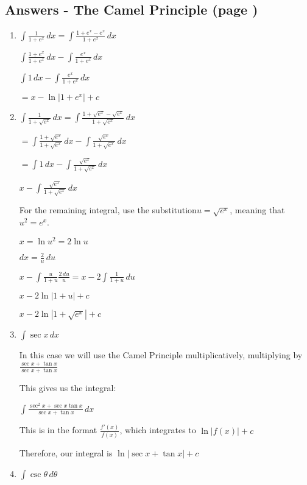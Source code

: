 \documentclass[../main.tex]{subfiles}
\begin{document}
\subsection*{Answers - The Camel Principle (page \pageref{Camel Principle})}

\begin{enumerate}
    \item 
    \(\int \frac{1}{1+e^x}\,dx=\int \frac{1+e^x-e^x}{1+e^x}\,dx\)
    
    \(\int \frac{1+e^x}{1+e^x}\,dx-\int \frac{e^x}{1+e^x}\,dx\)

    \(\int 1\,dx-\int \frac{e^x}{1+e^x}\,dx\)

    \(=x-\ln{|1+e^x|}+c\)
    
    \item 
    \(\int \frac{1}{1+\sqrt{e^x}}\,dx=\int \frac{1+\sqrt{e^x}-\sqrt{e^x}}{1+\sqrt{e^x}}\,dx\)

    \(=\int \frac{1+\sqrt{e^x}}{1+\sqrt{e^x}}\,dx-\int \frac{\sqrt{e^x}}{1+\sqrt{e^x}}\,dx\)

    \(=\int 1\,dx-\int \frac{\sqrt{e^x}}{1+\sqrt{e^x}}\,dx\)

    \(x-\int \frac{\sqrt{e^x}}{1+\sqrt{e^x}}\,dx\)

    For the remaining integral, use the substitution\(u=\sqrt{e^x}\), meaning that \(u^2=e^x\).

    \(x=\ln{u^2}=2\ln{u}\)

    \(dx=\frac{2}{u}\,du\)

    \(x-\int \frac{u}{1+u}\frac{2\,du}{u}=x-2\int \frac{1}{1+u}\,du\)

    \(x-2\ln{|1+u|}+c\)

    \(x-2\ln{|1+\sqrt{e^x}|}+c\)
    
    \item 
    \(\int \sec{x}\,dx\)

    In this case we will use the Camel Principle multiplicatively, multiplying by \(\frac{\sec{x}+\tan{x}}{\sec{x}+\tan{x}}\)

    This gives us the integral:

    \(\int \frac{\sec^2{x}+\sec{x}\tan{x}}{\sec{x}+\tan{x}}\,dx\)

    This is in the format \(\frac{f'(x)}{f(x)}\), which integrates to \(\ln{|f(x)|}+c\)

    Therefore, our integral is \(\ln{|\sec{x}+\tan{x}|}+c\)

    \item 
    \(\int \csc{\theta}\,d\theta\)


\end{enumerate}
\end{document}
